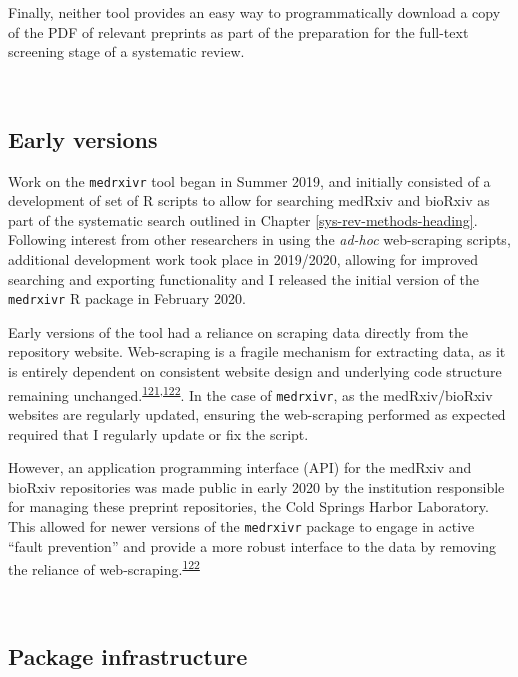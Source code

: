 \documentclass[a4paper, twoside]{templates/ociamthesis}
\begin{document}
Finally, neither tool provides an easy way to programmatically download a copy of the PDF of relevant preprints as part of the preparation for the full-text screening stage of a systematic review.

~

\hypertarget{early-versions}{%
\subsection{Early versions}\label{early-versions}}

Work on the \texttt{medrxivr} tool began in Summer 2019, and initially consisted of a development of set of R scripts to allow for searching medRxiv and bioRxiv as part of the systematic search outlined in Chapter \ref{sys-rev-methods-heading}. Following interest from other researchers in using the \emph{ad-hoc} web-scraping scripts, additional development work took place in 2019/2020, allowing for improved searching and exporting functionality and I released the initial version of the \texttt{medrxivr} R package in February 2020.

Early versions of the tool had a reliance on scraping data directly from the repository website. Web-scraping is a fragile mechanism for extracting data, as it is entirely dependent on consistent website design and underlying code structure remaining unchanged.\textsuperscript{\protect\hyperlink{ref-shaw2002}{121},\protect\hyperlink{ref-laprie1992}{122}}. In the case of \texttt{medrxivr}, as the medRxiv/bioRxiv websites are regularly updated, ensuring the web-scraping performed as expected required that I regularly update or fix the script.

However, an application programming interface (API) for the medRxiv and bioRxiv repositories was made public in early 2020 by the institution responsible for managing these preprint repositories, the Cold Springs Harbor Laboratory. This allowed for newer versions of the \texttt{medrxivr} package to engage in active ``fault prevention'' and provide a more robust interface to the data by removing the reliance of web-scraping.\textsuperscript{\protect\hyperlink{ref-laprie1992}{122}}

~

\hypertarget{package-infrastructure}{%
\subsection{Package infrastructure}\label{package-infrastructure}}
\end{document}
